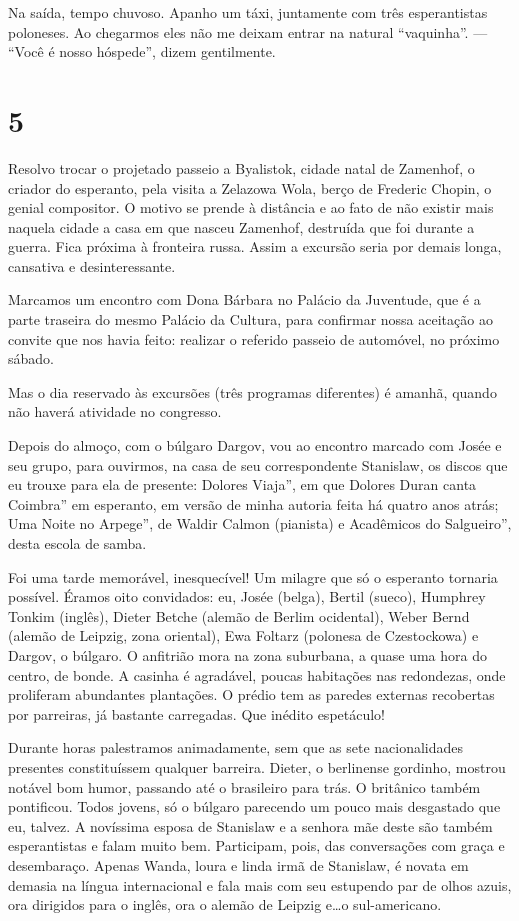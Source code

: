Na saída, tempo chuvoso. Apanho um táxi, juntamente com três esperantistas poloneses. Ao chegarmos eles não me deixam entrar na natural ``vaquinha''. --- ``Você é nosso hóspede'', dizem gentilmente.

\section*{5 \adfflatleafright {}}
Resolvo trocar o projetado passeio a Byalistok, cidade natal de Zamenhof, o criador do esperanto, pela visita a Zelazowa Wola, berço de Frederic Chopin, o genial compositor. O motivo se prende à distância e ao fato de não existir mais naquela cidade a casa em que nasceu Zamenhof, destruída que foi durante a guerra. Fica próxima à fronteira russa. Assim a excursão seria por demais longa, cansativa e desinteressante.

Marcamos um encontro com Dona Bárbara no Palácio da Juventude, que é a parte traseira do mesmo Palácio da Cultura, para confirmar nossa aceitação ao convite que nos havia feito: realizar o referido passeio de automóvel, no próximo sábado.

Mas o dia reservado às excursões (três programas diferentes) é amanhã, quando não haverá atividade no congresso.

Depois do almoço, com o búlgaro Dargov, vou ao encontro marcado com Josée e seu grupo, para ouvirmos, na casa de seu correspondente Stanislaw, os discos que eu trouxe para ela de presente: Dolores Viaja'', em que Dolores Duran canta Coimbra'' em esperanto, em versão de minha autoria feita há quatro anos atrás; Uma Noite no Arpege'', de Waldir Calmon (pianista) e Acadêmicos do Salgueiro'', desta escola de samba.

Foi uma tarde memorável, inesquecível! Um milagre que só o esperanto tornaria possível. Éramos oito convidados: eu, Josée (belga), Bertil (sueco), Humphrey Tonkim (inglês), Dieter Betche (alemão de Berlim ocidental), Weber Bernd (alemão de Leipzig, zona oriental), Ewa Foltarz (polonesa de Czestockowa) e Dargov, o búlgaro. O anfitrião mora na zona suburbana, a quase uma hora do centro, de bonde. A casinha é agradável, poucas habitações nas redondezas, onde proliferam abundantes plantações. O prédio tem as paredes externas recobertas por parreiras, já bastante carregadas. Que inédito espetáculo!

Durante horas palestramos animadamente, sem que as sete nacionalidades presentes constituíssem qualquer barreira. Dieter, o berlinense gordinho, mostrou notável bom humor, passando até o brasileiro para trás. O britânico também pontificou. Todos jovens, só o búlgaro parecendo um pouco mais desgastado que eu, talvez. A novíssima esposa de Stanislaw e a senhora mãe deste são também esperantistas e falam muito bem. Participam, pois, das conversações com graça e desembaraço. Apenas Wanda, loura e linda irmã de Stanislaw, é novata em demasia na língua internacional e fala mais com seu estupendo par de olhos azuis, ora dirigidos para o inglês, ora o alemão de Leipzig e\ldots o sul-americano.


